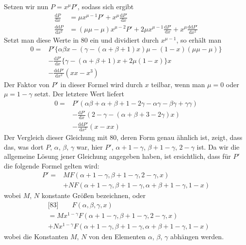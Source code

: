 
Setzen wir nun $P=x^\mu P'$, sodass sich ergibt
\[
\begin{aligned}
\frac{\mathrm{d}P}{\mathrm{d}x}&=\mu x^{\mu-1}P'+x^\mu\frac{\mathrm{d}P'}{\mathrm{d}x}\\
\frac{\mathrm{dd}P}{\mathrm{d}x^2}&=(\mu\mu-\mu)x^{\mu-2}P'+2\mu x^{\mu-1}\frac{\mathrm{d}P'}{\mathrm{d}x}+x^\mu\frac{\mathrm{dd}P'}{\mathrm{d}x^2}
\end{aligned}
\]
Setzt man diese Werte in 80 ein und dividiert durch $x^{\mu-1}$, so erhält man
\[
\begin{aligned}
0={}&P'\{\alpha\beta x-(\gamma-(\alpha+\beta+1)x)\mu-(1-x)(\mu\mu-\mu)\}\\
&-\frac{\mathrm{d}P'}{\mathrm{d}x}\{\gamma-(\alpha+\beta+1)x+2\mu(1-x)\}x\\
&-\frac{\mathrm{dd}P'}{\mathrm{d}x^2}(xx-x^3)
\end{aligned}
\]
Der Faktor von $P'$ in dieser Formel wird durch $x$ teilbar, wenn man $\mu=0$ oder $\mu=1-\gamma$ setzt. Der letztere Wert liefert
\[
\begin{aligned}
0={}&P'(\alpha\beta+\alpha+\beta+1-2\gamma-\alpha\gamma-\beta\gamma+\gamma\gamma)\\
&-\frac{\mathrm{d}P'}{\mathrm{d}x}(2-\gamma-(\alpha+\beta+3-2\gamma)x)\\
&-\frac{\mathrm{dd}P'}{\mathrm{d}x^2}(x-xx)
\end{aligned}
\]
Der Vergleich dieser Gleichung mit 80, deren Form genau ähnlich ist, zeigt, dass das, was dort $P$, $\alpha$, $\beta$, $\gamma$ war, hier $P'$, $\alpha+1-\gamma$, $\beta+1-\gamma$, $2-\gamma$ ist. Da wir die allgemeine Lösung jener Gleichung angegeben haben, ist ersichtlich, dass für $P'$ die folgende Formel gelten wird:
\[
\begin{aligned}
P'={}&MF(\alpha+1-\gamma,\beta+1-\gamma,2-\gamma,x)\\
&+NF(\alpha+1-\gamma,\beta+1-\gamma,\alpha+\beta+1-\gamma,1-x)
\end{aligned}
\]
wobei $M$, $N$ konstante Größen bezeichnen, oder
\[
\begin{aligned}
&\text{[83]}\qquad F(\alpha,\beta,\gamma,x)\\&=Mx^{1-\gamma}F(\alpha+1-\gamma,\beta+1-\gamma,2-\gamma,x)\\
&+Nx^{1-\gamma}F(\alpha+1-\gamma,\beta+1-\gamma,\alpha+\beta+1-\gamma,1-x)
\end{aligned}
\]
wobei die Konstanten $M$, $N$ von den Elementen $\alpha$, $\beta$, $\gamma$ abhängen werden.

